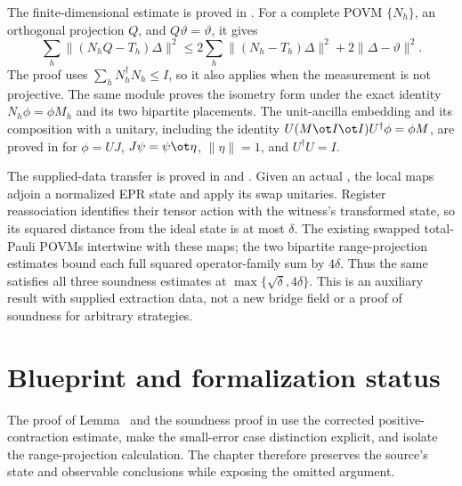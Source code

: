 \documentclass[11pt]{article}
\begin{document}
The finite-dimensional estimate is proved in
. For a complete POVM
$\{N_h\}$, an orthogonal projection $Q$, and $Q\vartheta=\vartheta$, it gives
\[
  \sum_h\|(N_hQ-T_h)\Delta\|^2
  \le 2\sum_h\|(N_h-T_h)\Delta\|^2+2\|\Delta-\vartheta\|^2.
\]
The proof uses $\sum_h N_h^\dagger N_h\le I$, so it also applies when the
measurement is not projective. The same module proves the isometry form under
the exact identity $N_h\phi=\phi M_h$ and its two bipartite placements. The
unit-ancilla embedding and its composition with a unitary, including the
identity $U(M\ot I\ot I)U^\dagger\phi=\phi M$, are proved in
 for $\phi=UJ$,
$J\psi=\psi\ot\eta$, $\|\eta\|=1$, and $U^\dagger U=I$.

The supplied-data transfer is proved in
 and
. Given an actual
, the local maps adjoin a normalized EPR state and
apply its swap unitaries. Register reassociation identifies their tensor
action with the witness's transformed state, so its squared distance from
the ideal state is at most $\delta$. The existing swapped total-Pauli POVMs
intertwine with these maps; the two bipartite range-projection estimates
bound each full squared operator-family sum by $4\delta$. Thus the same
 satisfies all three soundness estimates at
$\max\{\sqrt\delta,4\delta\}$. This is an auxiliary result with supplied
extraction data, not a new bridge field or a proof of soundness for arbitrary
strategies.

\section{Blueprint and formalization status}

The proof of Lemma~ and the soundness proof in
 use the corrected
positive-contraction estimate, make the small-error case distinction explicit,
and isolate the range-projection calculation.  The chapter therefore preserves
the source's state and observable conclusions while exposing the omitted
argument.
\end{document}
